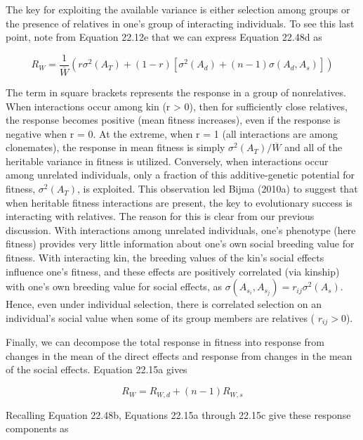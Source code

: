 \documentclass{article}
\begin{document}
The key for exploiting the available variance is either selection among groups or the presence of relatives in one's group of interacting individuals. To see this last point, note from Equation 22.12e that we can express Equation 22.48d as

\begin{equation}
R_{W}=\frac{1}{\overline{W}}\left(r\sigma^{2}(A_{T})+(1-r)\left[\sigma^{2}(A_{d})+(n-1)\sigma(A_{d},A_{s})\right]\right)
\tag{22.48e}
\label{eq:22_48e}
\end{equation}

The term in square brackets represents the response in a group of nonrelatives. When interactions occur among kin (r > 0), then for sufficiently close relatives, the response becomes positive (mean fitness increases), even if the response is negative when r = 0. At the extreme, when r = 1 (all interactions are among clonemates), the response in mean fitness is simply  $ \sigma^2(A_T)/\overline{W} $ and all of the heritable variance in fitness is utilized. Conversely, when interactions occur among unrelated individuals, only a fraction of this additive-genetic potential for fitness,  $ \sigma^2(A_T) $, is exploited. This observation led Bijma (2010a) to suggest that when heritable fitness interactions are present, the key to evolutionary success is interacting with relatives. The reason for this is clear from our previous discussion. With interactions among unrelated individuals, one's phenotype (here fitness) provides very little information about one's own social breeding value for fitness. With interacting kin, the breeding values of the kin's social effects influence one's fitness, and these effects are positively correlated (via kinship) with one's own breeding value for social effects, as  $ \sigma(A_{s_i}, A_{s_j}) = r_{ij} \sigma^2(A_s) $. Hence, even under individual selection, there is correlated selection on an individual's social value when some of its group members are relatives ( $ r_{ij} > 0 $).

Finally, we can decompose the total response in fitness into response from changes in the mean of the direct effects and response from changes in the mean of the social effects. Equation 22.15a gives

\begin{equation}
R_{W}=R_{W,d}+(n-1)R_{W,s}
\tag{22.49a}
\label{eq:22_49a}
\end{equation}

Recalling Equation 22.48b, Equations 22.15a through 22.15c give these response components as
\end{document}

